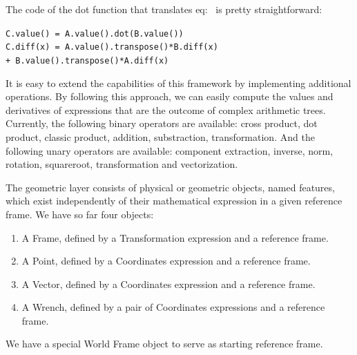 
The code of the dot function that translates eq:~ is pretty straightforward:
\begin{center}
{\tt C.value() = A.value().dot(B.value())\\
C.diff(x) = A.value().transpose()*B.diff(x) \\ + B.value().transpose()*A.diff(x)}
\end{center}

It is easy to extend the capabilities of this framework by implementing additional operations.
By following this approach, we can easily compute the values and derivatives of expressions that are the outcome of complex arithmetic trees.
Currently, the following binary operators are available: cross product, dot product, classic product, addition, substraction, transformation.
And the following unary operators are available: component extraction, inverse, norm, rotation, squareroot, transformation and vectorization.

The geometric layer consists of physical or geometric objects, named features, which exist independently of their mathematical expression in a given reference frame.
We have so far four objects:
\begin{enumerate}
  \item A Frame, defined by a Transformation expression and a reference frame.
  \item A Point, defined by a Coordinates expression and a reference frame.
  \item A Vector, defined by a Coordinates expression and a reference frame.
  \item A Wrench, defined by a pair of Coordinates expressions and a reference frame.
\end{enumerate}
We have a special World Frame object to serve as starting reference frame.

